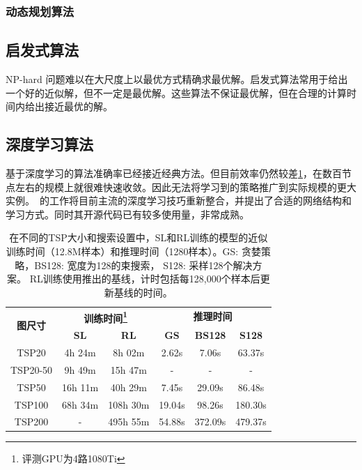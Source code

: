 \documentclass[lang=cn,11pt]{elegantpaper}
\begin{document}
\subsubsection{动态规划算法}

\subsection{启发式算法}
NP-hard 问题难以在大尺度上以最优方式精确求最优解。启发式算法常用于给出一个好的近似解，但不一定是最优解。这些算法不保证最优解，但在合理的计算时间内给出接近最优的解。

\subsection{深度学习算法}
基于深度学习的算法准确率已经接近经典方法。但目前效率仍然较差\ref{tab:timingindeeplerarning}，在数百节点左右的规模上就很难快速收敛。因此无法将学习到的策略推广到实际规模的更大实例。~\cite{goodDLforTSP}的工作将目前主流的深度学习技巧重新整合，并提出了合适的网络结构和学习方式。同时其开源代码已有较多使用量，非常成熟。
\begin{table}[ht]
    \centering
    \caption{在不同的TSP大小和搜索设置中，SL和RL训练的模型的近似训练时间（12.8M样本）和推理时间（1280样本）。GS: 贪婪策略，BS128: 宽度为128的束搜索， S128: 采样128个解决方案。 RL训练使用推出的基线，计时包括每128,000个样本后更新基线的时间。} 
    \label{tab:timingindeeplerarning}
    \begin{tabular}{cccccc}
        \toprule
        \multirow{2}{*}{\textbf{图尺寸}} & \multicolumn{2}{c}{\textbf{训练时间\footnote{评测GPU为4路1080Ti}}} & \multicolumn{3}{c}{\textbf{推理时间}} \\
         & \textbf{SL} & \textbf{RL} & \textbf{GS} & \textbf{BS128} & \textbf{S128} \\
        \midrule
        \midrule
        TSP20 & 4h 24m & 8h 02m & 2.62s & 7.06s & 63.37s \\
        TSP20-50 & 9h 49m & 15h 47m & - & - & - \\
        TSP50 & 16h 11m & 40h 29m & 7.45s & 29.09s & 86.48s \\
        TSP100 & 68h 34m & 108h 30m & 19.04s & 98.26s & 180.30s \\
        TSP200 & - & 495h 55m & 54.88s & 372.09s & 479.37s \\
        \bottomrule
    \end{tabular}
\end{table}
\end{document}
